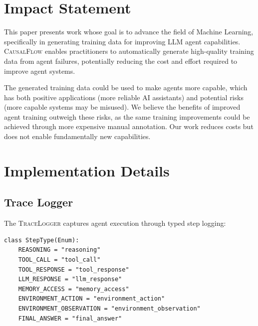 \documentclass{article}
\theoremstyle{plain}
\theoremstyle{definition}
\theoremstyle{remark}
\begin{document}
\section*{Impact Statement}

This paper presents work whose goal is to advance the field of Machine Learning, specifically in generating training data for improving LLM agent capabilities. \textsc{CausalFlow} enables practitioners to automatically generate high-quality training data from agent failures, potentially reducing the cost and effort required to improve agent systems.

The generated training data could be used to make agents more capable, which has both positive applications (more reliable AI assistants) and potential risks (more capable systems may be misused). We believe the benefits of improved agent training outweigh these risks, as the same training improvements could be achieved through more expensive manual annotation. Our work reduces costs but does not enable fundamentally new capabilities.





\newpage
\appendix
\onecolumn
\section{Implementation Details}

\subsection{Trace Logger}

The \textsc{TraceLogger} captures agent execution through typed step logging:

\begin{verbatim}
class StepType(Enum):
    REASONING = "reasoning"
    TOOL_CALL = "tool_call"
    TOOL_RESPONSE = "tool_response"
    LLM_RESPONSE = "llm_response"
    MEMORY_ACCESS = "memory_access"
    ENVIRONMENT_ACTION = "environment_action"
    ENVIRONMENT_OBSERVATION = "environment_observation"
    FINAL_ANSWER = "final_answer"
\end{verbatim}
\end{document}
